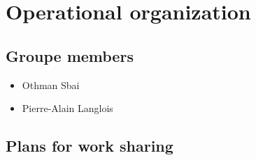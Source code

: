\documentclass[a4paper,10pt]{article}
\begin{document}
\section{Operational organization}

\subsection{Groupe members}

\begin{itemize}
 \item Othman Sbai
 \item Pierre-Alain Langlois
\end{itemize}


\subsection{Plans for work sharing}



\end{document}
